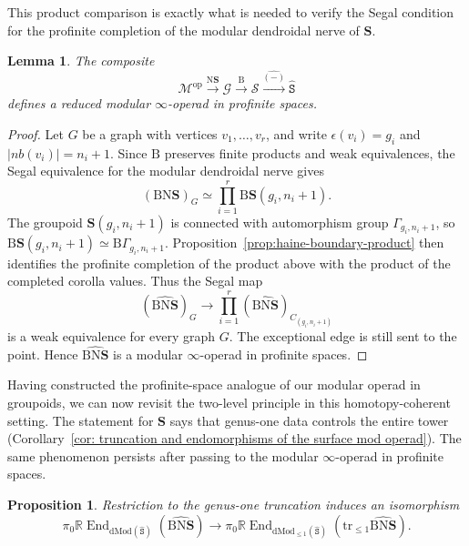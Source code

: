 \documentclass{amsart}
\newcommand{\bM}{\mathscr{M}}
\newcommand{\bS}{\mathbf{S}}
\newcommand{\sSet}{\mathscr{S}}
\newcommand{\isSet}{\mathtt{S}}
\newcommand{\Grpd}{\mathscr{G}}
\newcommand{\dMod}{\mathrm{dMod}}
\newcommand{\op}{\mathrm{op}}
\newcommand{\cs}{\mathrm{B}}
\newcommand{\nerve}{\mathrm{N}}
\newcommand{\End}{\operatorname{End}}
\newcommand{\trun}[1]{\mathrm{tr}_{\leq{#1}}}
\newcommand{\nb}{nb}
\newcommand{\corolla}{C}
\newtheorem{prop}[theorem]{Proposition}%
\newtheorem{lemma}[theorem]{Lemma}%
\theoremstyle{definition}
\numberwithin{equation}{section}
\begin{document}
This product comparison is exactly what is needed to verify the Segal condition for the profinite completion of the modular dendroidal nerve of $\bS$.

\begin{lemma}\label{lemma:teichmuller-tower-is-modular-infty-operad}
The composite
\[
\bM^{\op}\xrightarrow{\nerve\bS}\Grpd\xrightarrow{\cs}\sSet\xrightarrow{\widehat{(-)}}\widehat{\isSet}
\]
defines a reduced modular $\infty$-operad in profinite spaces.
\end{lemma}

\begin{proof}
Let $G$ be a graph with vertices $v_1,\ldots,v_r$, and write
$\epsilon(v_i)=g_i$ and $|\nb(v_i)|=n_i+1$. Since $\cs$ preserves finite products and weak equivalences, the Segal equivalence for the modular dendroidal nerve gives
\[
(\cs\nerve\bS)_G
\simeq
\prod_{i=1}^r \cs\bS(g_i,n_i+1).
\]
The groupoid $\bS(g_i,n_i+1)$ is connected with automorphism group $\Gamma_{g_i,n_i+1}$, so
$\cs\bS(g_i,n_i+1)\simeq \cs\Gamma_{g_i,n_i+1}$. Proposition~\ref{prop:haine-boundary-product} then identifies the profinite completion of the product above with the product of the completed corolla values. Thus the Segal map
\[
(\widehat{\cs\nerve\bS})_G
\longrightarrow
\prod_{i=1}^r
(\widehat{\cs\nerve\bS})_{\corolla_{(g_i,n_i+1)}}
\]
is a weak equivalence for every graph $G$. The exceptional edge is still sent to the point. Hence $\widehat{\cs\nerve\bS}$ is a modular $\infty$-operad in profinite spaces.
\end{proof}

Having constructed the profinite-space analogue of our modular operad in groupoids, we can now revisit the two-level principle in this homotopy-coherent setting. The statement for $\bS$ says that genus-one data controls the entire tower (Corollary~\ref{cor: truncation and endomorphisms of the surface mod operad}). The same phenomenon persists after passing to the modular $\infty$-operad in profinite spaces.


\begin{prop}\label{prop: two-level profinite space model}
Restriction to the genus-one truncation induces an isomorphism
\[
\pi_0\mathbb R\End_{\dMod(\widehat{\isSet})}(\widehat{\cs\nerve\bS})
\longrightarrow
\pi_0\mathbb R\End_{\dMod_{\leq 1}(\widehat{\isSet})}(\trun{1}\widehat{\cs\nerve\bS}).
\]
\end{prop}
\end{document}
